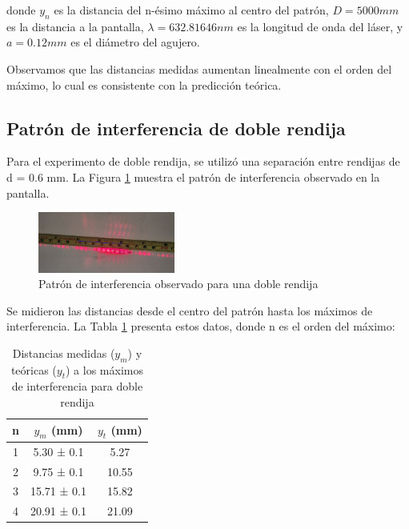 \documentclass[twocolumn,a4paper,11pt]{scrartcl}
\begin{document}
donde $y_n$ es la distancia del n-ésimo máximo al centro del patrón, $D= 5000 mm $ es la distancia a la pantalla, $\lambda = 632.81646 nm $ es la longitud de onda del láser, y $a = 0.12 mm$ es el diámetro del agujero.

Observamos que las distancias medidas aumentan linealmente con el orden del máximo, lo cual es consistente con la predicción teórica. 

\subsection{Patrón de interferencia de doble rendija}

Para el experimento de doble rendija, se utilizó una separación entre rendijas de d = 0.6 mm. La Figura \ref{fig:interference_pattern} muestra el patrón de interferencia observado en la pantalla.

\begin{figure}[h]
    \centering
    \includegraphics[width=0.4\textwidth]{double_slit.png}
    \caption{Patrón de interferencia observado para una doble rendija}
    \label{fig:interference_pattern}
\end{figure}

Se midieron las distancias desde el centro del patrón hasta los máximos de interferencia. La Tabla \ref{tab:interference_maxima} presenta estos datos, donde n es el orden del máximo:

\vspace{1em}
\begin{table}[h!]
    \centering
    \begin{tabular}{|c|c|c|}
        \hline
        n & $y_m$ (mm) & $y_t$ (mm) \\
        \hline
        1 & 5.30 ± 0.1 & 5.27 \\
        2 & 9.75 ± 0.1 & 10.55 \\
        3 & 15.71 ± 0.1 & 15.82 \\
        4 & 20.91 ± 0.1 & 21.09 \\
        \hline
    \end{tabular}
    \caption{Distancias medidas ($y_m$) y teóricas ($y_t$) a los máximos de interferencia para doble rendija}
    \label{tab:interference_maxima}
\end{table}
\vspace{1em}
\end{document}
